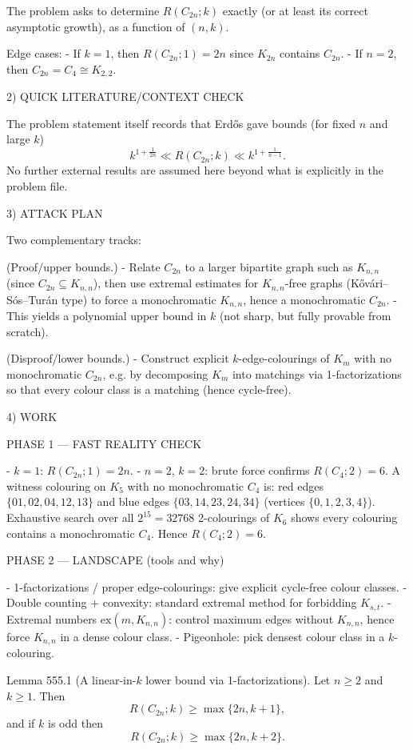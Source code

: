 The problem asks to determine $R(C_{2n};k)$ exactly (or at least its correct asymptotic growth), as a function of $(n,k)$.

Edge cases:
- If $k=1$, then $R(C_{2n};1)=2n$ since $K_{2n}$ contains $C_{2n}$.
- If $n=2$, then $C_{2n}=C_4\cong K_{2,2}$.

2) QUICK LITERATURE/CONTEXT CHECK

The problem statement itself records that Erd\H{o}s gave bounds (for fixed $n$ and large $k$)
\[
k^{1+\frac{1}{2n}}\ll R(C_{2n};k)\ll k^{1+\frac{1}{n-1}}.
\]
No further external results are assumed here beyond what is explicitly in the problem file.

3) ATTACK PLAN

Two complementary tracks:

(Proof/upper bounds.)
- Relate $C_{2n}$ to a larger bipartite graph such as $K_{n,n}$ (since $C_{2n}\subseteq K_{n,n}$), then use extremal estimates for $K_{n,n}$-free graphs (K\H{o}v\'ari--S\'os--Tur\'an type) to force a monochromatic $K_{n,n}$, hence a monochromatic $C_{2n}$.
- This yields a polynomial upper bound in $k$ (not sharp, but fully provable from scratch).

(Disproof/lower bounds.)
- Construct explicit $k$-edge-colourings of $K_m$ with no monochromatic $C_{2n}$, e.g. by decomposing $K_m$ into matchings via 1-factorizations so that every colour class is a matching (hence cycle-free).

4) WORK

PHASE 1 — FAST REALITY CHECK

- $k=1$: $R(C_{2n};1)=2n$.
- $n=2$, $k=2$: brute force confirms $R(C_4;2)=6$.
A witness colouring on $K_5$ with no monochromatic $C_4$ is:
red edges $\{01,02,04,12,13\}$ and blue edges $\{03,14,23,24,34\}$ (vertices $\{0,1,2,3,4\}$).
Exhaustive search over all $2^{15}=32768$ 2-colourings of $K_6$ shows every colouring contains a monochromatic $C_4$.
Hence $R(C_4;2)=6$.

PHASE 2 — LANDSCAPE (tools and why)

- 1-factorizations / proper edge-colourings: give explicit cycle-free colour classes.
- Double counting + convexity: standard extremal method for forbidding $K_{s,t}$.
- Extremal numbers $\mathrm{ex}(m,K_{n,n})$: control maximum edges without $K_{n,n}$, hence force $K_{n,n}$ in a dense colour class.
- Pigeonhole: pick densest colour class in a $k$-colouring.

Lemma 555.1 (A linear-in-$k$ lower bound via 1-factorizations).
Let $n\ge 2$ and $k\ge 1$.
Then
\[
R(C_{2n};k)\ge \max\{2n,k+1\},
\]
and if $k$ is odd then
\[
R(C_{2n};k)\ge \max\{2n,k+2\}.
\]

